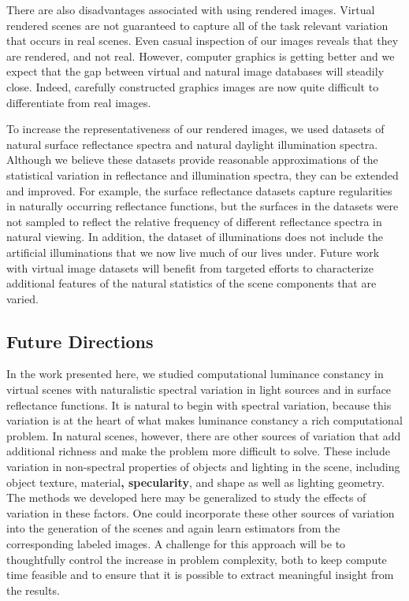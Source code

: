 \documentclass{jov}
\providecommand{\DIFaddtex}[1]{{\bf #1}} %
\providecommand{\DIFaddbegin}{} %
\providecommand{\DIFaddend}{} %
\providecommand{\DIFadd}[1]{\texorpdfstring{\DIFaddtex{#1}}{#1}} %
\newcommand{\DIFaddincludegraphics}[2][]{{\color{blue}\fbox{\DIFOincludegraphics[#1]{#2}}}} %
\DeclareRobustCommand{\DIFaddbegin}{\DIFOaddbegin \let\includegraphics\DIFaddincludegraphics} %
\DeclareRobustCommand{\DIFaddend}{\DIFOaddend \let\includegraphics\DIFOincludegraphics} %
\begin{document}
There are also disadvantages associated with using rendered images. 
Virtual rendered scenes are not guaranteed to capture all of the task relevant variation that occurs in real scenes.
Even casual inspection of our images reveals that they are rendered, and not real.
However, computer graphics is getting better and we expect that the gap between virtual and natural image databases will steadily close.
Indeed, carefully constructed graphics images are now quite difficult to differentiate from real images.

To increase the representativeness of our rendered images, we used datasets of  natural surface reflectance spectra and natural daylight illumination spectra.
Although we believe these datasets provide reasonable approximations of the statistical variation in reflectance and illumination spectra, they can be extended and improved.
For example, the surface reflectance datasets capture regularities in naturally occurring reflectance functions, but the surfaces in the datasets were not sampled to reflect the relative frequency of different reflectance spectra in natural viewing. 
In addition, the dataset of illuminations does not include the artificial illuminations that we now live much of our lives under.
Future work with virtual image datasets will benefit from targeted efforts to characterize additional features of the natural statistics of the scene components that are varied.

\subsection{Future Directions}
In the work presented here, we studied computational luminance constancy in virtual scenes with naturalistic spectral variation in light sources and in surface reflectance functions. 
It is natural to begin with spectral variation, because this variation is at the heart of what makes luminance constancy a rich computational problem.
In natural scenes, however, there are other sources of variation that add additional richness and make the problem more difficult to solve.
These include variation in non-spectral properties of objects and lighting in the scene, including object texture, material\DIFaddbegin \DIFadd{, specularity}\DIFaddend , and shape as well as lighting geometry. 
The methods we developed here may be generalized to study the effects of variation in these factors.
One could incorporate these other sources of variation into the generation of the scenes and again learn estimators from the corresponding labeled images. 
A challenge for this approach will be to thoughtfully control the increase in problem complexity, both to keep compute time feasible and to ensure that it is possible to extract meaningful insight from the results.
\end{document}
